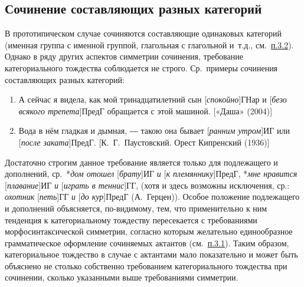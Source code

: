 \hypertarget{ux441ux43eux447ux438ux43dux435ux43dux438ux435-ux441ux43eux441ux442ux430ux432ux43bux44fux44eux449ux438ux445-ux440ux430ux437ux43dux44bux445-ux43aux430ux442ux435ux433ux43eux440ux438ux439}{%
\subsection{Сочинение составляющих разных
категорий}\label{ux441ux43eux447ux438ux43dux435ux43dux438ux435-ux441ux43eux441ux442ux430ux432ux43bux44fux44eux449ux438ux445-ux440ux430ux437ux43dux44bux445-ux43aux430ux442ux435ux433ux43eux440ux438ux439}}

В прототипическом случае сочиняются составляющие одинаковых категорий
(именная группа с именной группой, глагольная с глагольной и~т.д.,
см.~\underline{п.3.2}). Однако в ряду других аспектов симметрии
сочинения, требование категориального тождества соблюдается не строго.
Ср.~примеры сочинения составляющих разных категорий:

\begin{enumerate}
\def\labelenumi{(\arabic{enumi})}
\setcounter{enumi}{30}
\item
  А сейчас я видела, как мой тринадцатилетний сын
  {[}\emph{спокойно}{]}ГНар и {[}\emph{безо всякого трепета}{]}ПредГ
  обращается с этой машиной. {[}«Даша» (2004){]}
\item
  Вода в нём гладкая и дымная, ― такою она бывает {[}\emph{ранним
  утром}{]}ИГ или {[}\emph{после заката}{]}ПредГ. {[}К.~Г.~Паустовский.
  Орест Кипренский (1936){]}
\end{enumerate}

Достаточно строгим данное требование является только для подлежащего и
дополнений, ср.~*\emph{дом отошел} {[}\emph{брату}{]}ИГ \emph{и}
{[}\emph{к племяннику}{]}ПредГ, *\emph{мне нравится}
{[}\emph{плавание}{]}ИГ \emph{и} {[}\emph{играть в теннис}{]}ГГ, (хотя и
здесь возможны исключения, ср.: \emph{охотник} {[}\emph{петь}{]}ГГ
\emph{и} {[}\emph{до кур}{]}ПредГ (А.~Герцен)). Особое положение
подлежащего и дополнений объясняется, по-видимому, тем, что
применительно к ним тенденция к категориальному тождеству пересекается с
требованиями морфосинтаксической симметрии, согласно которым желательно
единообразное грамматическое оформление сочиняемых актантов
(см.~\underline{п.3.1}). Таким образом, категориальное тождество в
случае с актантами мало показательно и может быть объяснено не столько
собственно требованием категориального тождества при сочинении, сколько
указанными выше требованиями симметрии.

